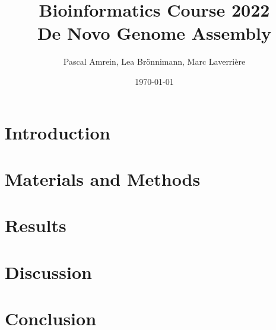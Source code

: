 \documentclass{article}
\title{Bioinformatics Course 2022\\ \textbf{De Novo Genome Assembly}} %
\author{Pascal Amrein, Lea Brönnimann, Marc Laverrière}
\date{\today}
\begin{document}
\maketitle


\renewcommand{\abstractname}{Abstract}
\begin{abstract}
    
\end{abstract}


\section{Introduction}
\citep{Blin2021}

\section{Materials and Methods}



\section{Results}

\section{Discussion}

\section{Conclusion}




\end{document}
